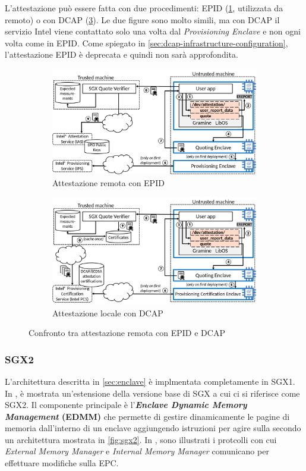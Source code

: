 \documentclass{article}
\begin{document}
L'attestazione può essere fatta con due procedimenti: EPID (\cref{fig:ra-epid}, utilizzata da remoto) o con DCAP (\cref{fig:ra-dcap}). Le due figure sono molto simili, ma con DCAP il servizio Intel viene contattato solo una volta dal \textit{Provisioning Enclave} e non ogni volta come in EPID. Come spiegato in \cref{sec:dcap-infrastructure-configuration}, l'attestazione EPID è deprecata e quindi non sarà approfondita.

\begin{figure}[h]
\centering
\begin{subfigure}{.5\textwidth}
  \centering
  \includegraphics[width=.95\textwidth]{figures/ch1/ra-sgx-epid.png}
  \caption{Attestazione remota con EPID}\label{fig:ra-epid}
\end{subfigure}%
\begin{subfigure}{.5\textwidth}
  \centering
    \includegraphics[width=.95\textwidth]{figures/ch1/ra-sgx-dcap.png}
  \caption{Attestazione locale con DCAP}\label{fig:ra-dcap}
\end{subfigure}
\caption{Confronto tra attestazione remota con EPID e DCAP}
\end{figure}

\subsubsection{SGX2}
L'architettura descritta in \cref{sec:enclave} è implmentata completamente in SGX1. In \cite{10.1145/2948618.2954331}, è mostrata un'estensione della versione base di SGX a cui ci si riferisce come SGX2. Il componente principale è l'\textbf{\textit{Enclave Dynamic Memory Management} (EDMM)} che permette di gestire dinamicamente le pagine di memoria dall'interno di un enclave aggiungendo istruzioni per agire sulla secondo un architettura mostrata in \cref{fig:sgx2}. In \cite{10.1145/2948618.2954331}, sono illustrati i protcolli con cui \textit{External Memory Manager} e \textit{Internal Memory Manager} comunicano per effettuare modifiche sulla EPC.
\end{document}

